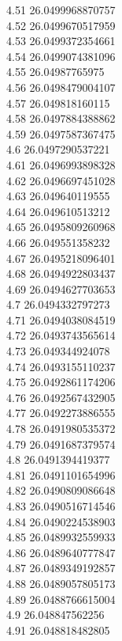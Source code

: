 {4.51	26.0499968870757\\
4.52	26.0499670517959\\
4.53	26.0499372354661\\
4.54	26.0499074381096\\
4.55	26.04987765975\\
4.56	26.0498479004107\\
4.57	26.049818160115\\
4.58	26.0497884388862\\
4.59	26.0497587367475\\
4.6	26.0497290537221\\
4.61	26.0496993898328\\
4.62	26.0496697451028\\
4.63	26.049640119555\\
4.64	26.049610513212\\
4.65	26.0495809260968\\
4.66	26.049551358232\\
4.67	26.0495218096401\\
4.68	26.0494922803437\\
4.69	26.0494627703653\\
4.7	26.0494332797273\\
4.71	26.0494038084519\\
4.72	26.0493743565614\\
4.73	26.049344924078\\
4.74	26.0493155110237\\
4.75	26.0492861174206\\
4.76	26.0492567432905\\
4.77	26.0492273886555\\
4.78	26.0491980535372\\
4.79	26.0491687379574\\
4.8	26.0491394419377\\
4.81	26.0491101654996\\
4.82	26.0490809086648\\
4.83	26.0490516714546\\
4.84	26.0490224538903\\
4.85	26.0489932559933\\
4.86	26.0489640777847\\
4.87	26.0489349192857\\
4.88	26.0489057805173\\
4.89	26.0488766615004\\
4.9	26.048847562256\\
4.91	26.048818482805\\
}
